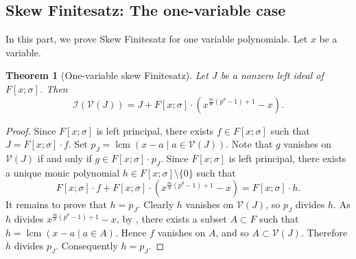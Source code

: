 \documentclass[11pt,reqno]{amsart}
\newtheorem{thm}{Theorem}[section]
\theoremstyle{definition}
\DeclareMathOperator{\lcm}{lcm}
\begin{document}
\subsection{Skew Finitesatz: The one-variable case}
In this part, we prove Skew Finitesatz for one variable polynomials. Let $x$ be a variable.
\begin{thm}[One-variable skew Finitesatz]\label{thm:skewonedim}
Let $J$ be a nonzero left ideal of $F[x;\sigma]$. Then 
$$\mathscr{I}(\mathscr{V}(J))= J+F[x;\sigma]\cdot \left(x^{\frac{m}{\theta}(p^\theta-1)+1}-x\right)
.$$
\end{thm}
\begin{proof}
Since $F[x;\sigma]$ is left principal, there exists $f \in F[x;\sigma]$ such that $J= F[x;\sigma] \cdot f$. Set $p_J=\lcm(x-a \mid a \in \mathscr{V}(J))$. Note that $g$ vanishes on $\mathscr{V}(J)$ if and only if $g \in F[x;\sigma] \cdot p_J$. Since $F[x;\sigma]$ is left principal, there exists a unique monic polynomial $h \in F[x;\sigma] \setminus \{0\}$ such that
$$
F[x;\sigma]\cdot f + F[x;\sigma] \cdot \left(x^{\frac{m}{\theta}(p^\theta-1)+1}-x\right)=F[x;\sigma]\cdot h. 
$$It remains to prove that $h=p_J$. Clearly $h$ vanishes on $\mathscr{V}(J)$, so $p_J$ divides $h$. As $h$ divides $x^{\frac{m}{\theta}(p^\theta-1)+1}-x$, by \cite[Theorem 5.1]{LL04} , there exists a subset $A \subset F$ such that $h=\lcm(x-a \mid a \in A)$. Hence $f$ vanishes on $A$, and so $A \subset \mathscr{V}(J)$. Therefore $h$ divides $p_J$. Consequently $h=p_J$. 
\end{proof}
\end{document}
